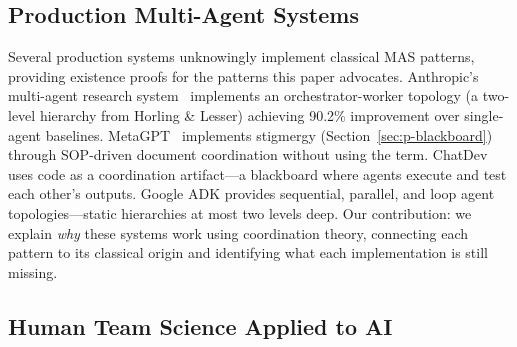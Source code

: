 \documentclass{article}
\begin{document}
\subsection{Production Multi-Agent Systems}
\label{sec:rel-production}

%
%

Several production systems unknowingly implement classical MAS patterns, providing
existence proofs for the patterns this paper advocates. Anthropic's multi-agent research
system~\citep{anthropic2025building} implements an orchestrator-worker topology
(a two-level hierarchy from Horling \& Lesser) achieving 90.2\% improvement over
single-agent baselines. MetaGPT~\citep{hong2024metagpt} implements stigmergy
(Section~\ref{sec:p-blackboard}) through SOP-driven document coordination without using
the term. ChatDev~\citep{qian2024chatdev} uses code as a coordination artifact---a
blackboard where agents execute and test each other's outputs. Google ADK provides
sequential, parallel, and loop agent topologies---static hierarchies at most two levels
deep. Our contribution: we explain \emph{why} these systems work using coordination
theory, connecting each pattern to its classical origin and identifying what each
implementation is still missing.

\subsection{Human Team Science Applied to AI}
\label{sec:rel-human}

%
%
\end{document}
